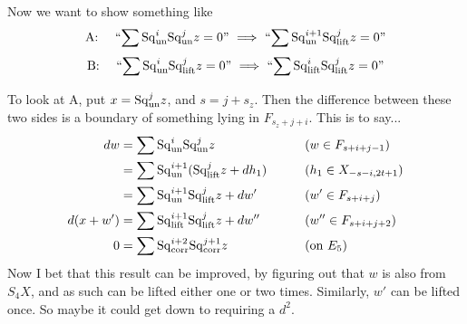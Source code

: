 \documentclass[10pt]{article}
\newcommand{\Sq}{\mathrm{Sq}}
\begin{document}
\begin{AdamsSSEQ operations final}
Now we want to show something like 
\[\textup{A: \ \ \ ``$\sum \Sq^{i}_\textup{un}\Sq^{j}_\textup{un}z=0$'' $\implies$ ``$\sum \Sq^{i+1}_\textup{un}\Sq^{j}_\textup{lift}z=0$''}\]
\[\textup{B: \ \ \ ``$\sum \Sq^{i}_\textup{un}\Sq^{j}_\textup{lift}z=0$'' $\implies$ ``$\sum \Sq^{i}_\textup{lift}\Sq^{j}_\textup{lift}z=0$''}\]

To look at A, put $x=\Sq^j_\textup{un}z$, and $s=j+s_z$. Then the difference between these two sides is a boundary of something lying in $F_{s_z+j+i}$. This is to say...
\begin{alignat*}{2}
dw
&=
\sum \Sq^i_\textup{un}\Sq^j_\textup{un}z%
&\qquad&\text{($w\in F_{s+i+j-1}$)}\\
&=
\sum \Sq^{i+1}_\textup{un}(\Sq^j_\textup{lift}z+dh_1)
&\qquad&\text{($h_1\in X_{-s-i,2t+1}$)}\\
&=
\sum \Sq^{i+1}_\textup{un}\Sq^j_\textup{lift}z+dw'
&\qquad&\text{($w'\in F_{s+i+j}$)}\\
d(x+w')&=
\sum \Sq^{i+1}_\textup{lift}\Sq^j_\textup{lift}z+dw''
&\qquad&\text{($w''\in F_{s+i+j+2}$)}\\
0%
&=
\sum \Sq^{i+2}_\textup{corr}\Sq^{j+1}_\textup{corr}z
&\qquad&\text{(on $E_5$)}
\end{alignat*}
Now I bet that this result can be improved, by figuring out that $w$ is also from $S_4X$, and as such can be lifted either one or two times. Similarly, $w'$ can be lifted once. So maybe it could get down to requiring a $d^2$.

\end{AdamsSSEQ operations final}
\end{document}
